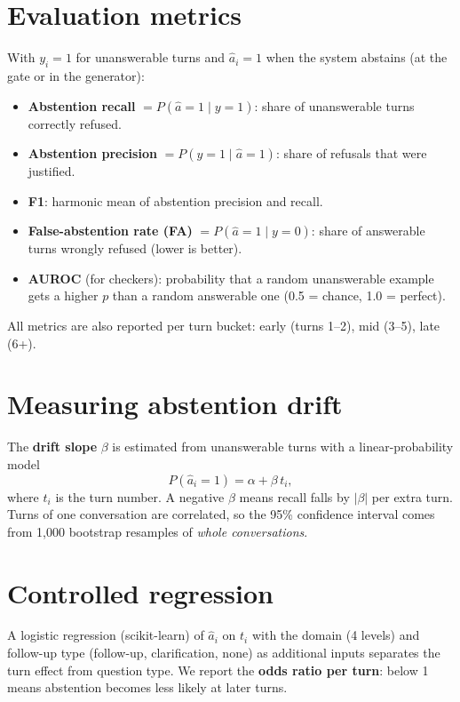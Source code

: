 \documentclass[11pt,a4paper]{report}
\begin{document}
\section{Evaluation metrics}
With $y_i=1$ for unanswerable turns and $\hat a_i=1$ when the system abstains (at the gate or in the generator):
\begin{itemize}
\item \textbf{Abstention recall} $= P(\hat a=1 \mid y=1)$: share of unanswerable turns correctly refused.
\item \textbf{Abstention precision} $= P(y=1 \mid \hat a=1)$: share of refusals that were justified.
\item \textbf{F1}: harmonic mean of abstention precision and recall.
\item \textbf{False-abstention rate (FA)} $= P(\hat a=1 \mid y=0)$: share of answerable turns wrongly refused (lower is better).
\item \textbf{AUROC} (for checkers): probability that a random unanswerable example gets a higher $p$ than a random answerable one (0.5 = chance, 1.0 = perfect).
\end{itemize}
All metrics are also reported per turn bucket: early (turns 1--2), mid (3--5), late (6+).

\section{Measuring abstention drift}
The \textbf{drift slope} $\beta$ is estimated from unanswerable turns with a linear-probability model
\[
P(\hat a_i = 1) = \alpha + \beta\, t_i ,
\]
where $t_i$ is the turn number. A negative $\beta$ means recall falls by $|\beta|$ per extra turn. Turns of one conversation are correlated, so the 95\% confidence interval comes from 1{,}000 bootstrap resamples of \emph{whole conversations}.

\section{Controlled regression}\label{sec:logit}
A logistic regression (scikit-learn) of $\hat a_i$ on $t_i$ with the domain (4 levels) and follow-up type (follow-up, clarification, none) as additional inputs separates the turn effect from question type. We report the \textbf{odds ratio per turn}: below 1 means abstention becomes less likely at later turns.
\end{document}
